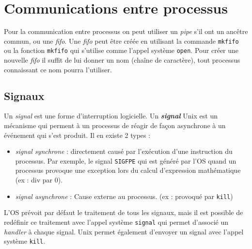 \section{Communications entre processus}
\label{communicationproc}
Pour la communication entre processus on peut utiliser un \textit{pipe} s'il ont un ancêtre commun, ou une \textit{fifo}. Une \textit{fifo} peut être créée en utilisant la commande \texttt{mkfifo} ou la fonction \texttt{mkfifo} qui s'utilise comme l'appel système \texttt{open}. Pour créer une nouvelle \textit{fifo} il suffit de lui donner un nom (chaîne de caractère), tout processus connaissant ce nom pourra l'utiliser.
\subsection{Signaux}
Un \textit{signal} est une forme d'interruption logicielle. Un \textit{\textbf{signal}} Unix est un mécanisme qui perment à un processus de réagir de façon asynchrone à un événement qui s'est produit. Il en existe 2 types :
\begin{itemize}
  \item \textit{signal synchrone} : directement causé par l'exécution d'une instruction du processus. Par exemple, le signal \texttt{SIGFPE} qui est généré par l'OS quand un processus provoque une exception lors du calcul d'expression mathématique (ex : div par 0).
  \item \textit{signal asynchrone} : Cause externe au processus. (ex : provoqué par \texttt{kill})
\end{itemize}
L'OS prévoit par défaut le traitement de tous les signaux, mais il est possible de redéfinir ce traitement avec l'appel système \texttt{signal} qui permet d'associé un \textit{handler} à chaque signal. Unix permet également d'envoyer un signal avec l'appel système \texttt{kill}.\\
